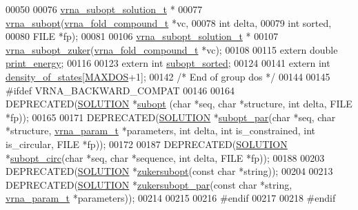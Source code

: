 \begin{DoxyCode}
00050 
00076 \hyperlink{structvrna__subopt__sol__s}{vrna\_subopt\_solution\_t} *
00077 \hyperlink{group__subopt__wuchty_ga7988544ae3fc6334c1517cf76e5660aa}{vrna\_subopt}(\hyperlink{group__fold__compound_structvrna__fc__s}{vrna\_fold\_compound\_t} *vc,
00078             \textcolor{keywordtype}{int} delta,
00079             \textcolor{keywordtype}{int} sorted,
00080             FILE *fp);
00081 
00106 \hyperlink{structvrna__subopt__sol__s}{vrna\_subopt\_solution\_t} *
00107 \hyperlink{group__subopt__zuker_gac0df98085abd242c7a6b1c868b3a35c8}{vrna\_subopt\_zuker}(\hyperlink{group__fold__compound_structvrna__fc__s}{vrna\_fold\_compound\_t} *vc);
00108 
00115 \textcolor{keyword}{extern}  \textcolor{keywordtype}{double}  \hyperlink{group__subopt__wuchty_ga5e57d914bcb5feeecdf520e25313fcfe}{print\_energy};
00116 
00123 \textcolor{keyword}{extern}  \textcolor{keywordtype}{int}     \hyperlink{group__subopt__wuchty_ga873cf8ed69e0437f8efa8b1fec854a0e}{subopt\_sorted};
00124 
00141 \textcolor{keyword}{extern}  \textcolor{keywordtype}{int}     \hyperlink{group__dos_ga937634a76b46a22530a74906f1957a9e}{density\_of\_states}[\hyperlink{subopt_8h_a5ec740b80afb4906ba4311dbd8ddbd89}{MAXDOS}+1];
00142  \textcolor{comment}{/* End of group dos */}
00144 
00145 \textcolor{preprocessor}{#ifdef VRNA\_BACKWARD\_COMPAT}
00146 
00164 DEPRECATED(\hyperlink{structvrna__subopt__sol__s}{SOLUTION} *\hyperlink{group__subopt__wuchty_ga700f662506a233e42dd7fda74fafd40e}{subopt} (\textcolor{keywordtype}{char} *seq, \textcolor{keywordtype}{char} *structure, \textcolor{keywordtype}{int} delta, FILE *fp));
00165 
00171 DEPRECATED(\hyperlink{structvrna__subopt__sol__s}{SOLUTION} *\hyperlink{group__subopt__wuchty_gaa1e1e7031a948ebcb39a9d58d1e9842c}{subopt\_par}(\textcolor{keywordtype}{char} *seq, \textcolor{keywordtype}{char} *structure, 
      \hyperlink{group__energy__parameters_structvrna__param__s}{vrna\_param\_t} *parameters, \textcolor{keywordtype}{int} delta, \textcolor{keywordtype}{int} is\_constrained, \textcolor{keywordtype}{int} is\_circular, FILE *fp));
00172 
00187 DEPRECATED(\hyperlink{structvrna__subopt__sol__s}{SOLUTION} *\hyperlink{group__subopt__wuchty_ga8634516e4740e0b6c9a46d2bae940340}{subopt\_circ}(\textcolor{keywordtype}{char} *seq, \textcolor{keywordtype}{char} *sequence, \textcolor{keywordtype}{int} delta, FILE *fp));
00188 
00203 DEPRECATED(\hyperlink{structvrna__subopt__sol__s}{SOLUTION}  *\hyperlink{group__subopt__zuker_ga0d5104e3ecf119d8eabd40aa5fe47f90}{zukersubopt}(\textcolor{keyword}{const} \textcolor{keywordtype}{char} *\textcolor{keywordtype}{string}));
00204 
00213 DEPRECATED(\hyperlink{structvrna__subopt__sol__s}{SOLUTION}  *\hyperlink{group__subopt__zuker_gab6d0ea8cc1d02f6dd831ca81043c9eb8}{zukersubopt\_par}(\textcolor{keyword}{const} \textcolor{keywordtype}{char} *\textcolor{keywordtype}{string}, 
      \hyperlink{group__energy__parameters_structvrna__param__s}{vrna\_param\_t} *parameters));
00214 
00215 
00216 \textcolor{preprocessor}{#endif}
00217 
00218 \textcolor{preprocessor}{#endif}
\end{DoxyCode}
